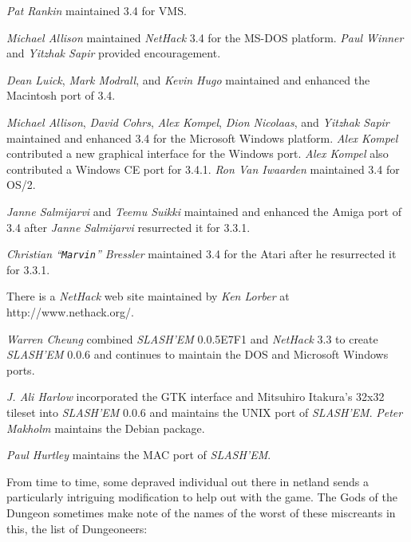 {\it Pat Rankin\/} maintained 3.4 for VMS.

{\it Michael Allison\/} maintained {\it NetHack\/} 3.4 for the MS-DOS platform.  {\it Paul Winner\/}
and {\it Yitzhak Sapir\/} provided encouragement.

{\it Dean Luick}, {\it Mark Modrall}, and {\it Kevin Hugo\/} maintained and enhanced the
Macintosh port of 3.4.

{\it Michael Allison}, {\it David Cohrs}, {\it Alex Kompel}, {\it Dion Nicolaas}, and 
{\it Yitzhak Sapir\/} maintained and enhanced 3.4 for the Microsoft Windows platform.
{\it Alex Kompel\/} contributed a new graphical interface for the Windows port. 
{\it Alex Kompel\/} also contributed a Windows CE port for 3.4.1.
{\it Ron Van Iwaarden\/} maintained 3.4 for OS/2.

{\it Janne Salmijarvi\/} and {\it Teemu Suikki\/} maintained and 
enhanced the Amiga port of 3.4 after {\it Janne Salmijarvi\/} resurrected 
it for 3.3.1.

{\it Christian ``{\tt Marvin}'' Bressler\/} maintained 3.4 for the Atari after he 
resurrected it for 3.3.1.

There is a {\it NetHack\/} web site maintained by {\it Ken Lorber\/} at http://www.nethack.org/.


{\it Warren Cheung\/} combined {\it SLASH'EM\/} 0.0.5E7F1 and {\it NetHack\/} 3.3 to create
{\it SLASH'EM\/} 0.0.6 and continues to maintain the DOS and Microsoft Windows ports.

{\it J. Ali Harlow\/} incorporated the GTK interface and Mitsuhiro Itakura's
32x32 tileset into {\it SLASH'EM\/} 0.0.6 and maintains the UNIX port of {\it SLASH'EM}.
{\it Peter Makholm\/} maintains the Debian package.

{\it Paul Hurtley\/} maintains the MAC port of {\it SLASH'EM}.

			  \bigskip

From time to time, some depraved individual out there in netland sends a
particularly intriguing modification to help out with the game.  The Gods of
the Dungeon sometimes make note of the names of the worst of these miscreants
in this, the list of Dungeoneers:

